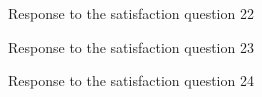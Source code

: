 \documentclass[12pt,oneside,openright,a4paper]{cpe-english-project}
\begin{document}
\begin{figure}[!h]\centering {} \caption{Response to the satisfaction question 22} \end{figure}
\begin{figure}[!h]\centering {} \caption{Response to the satisfaction question 23} \end{figure}
\begin{figure}[!h]\centering {} \caption{Response to the satisfaction question 24} \end{figure}
\end{document}
